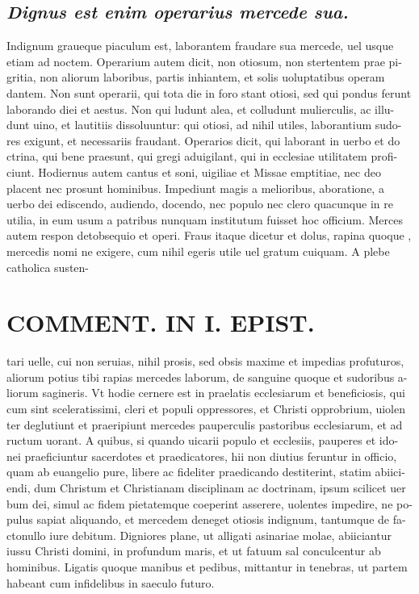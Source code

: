 \documentclass{article}
\begin{document}
\begin{pages}
\subsection*{\textit{Dignus est enim operarius mercede sua. }}\pstart Indignum graueque piaculum est, laborantem fraudare sua mercede, uel usque  etiam ad noctem. Operarium autem dicit, non otiosum, non stertentem prae pi- gritia, non aliorum laboribus, partis inhiantem, et solis uoluptatibus operam dantem. Non sunt operarii, qui tota die in foro stant otiosi, sed qui pondus ferunt laborando diei et aestus. Non qui ludunt alea, et colludunt mulierculis, ac illu- dunt uino, et lautitiis dissoluuntur: qui otiosi, ad nihil utiles, laborantium sudo- res exigunt, et necessariis fraudant. Operarios dicit, qui laborant in uerbo et do ctrina, qui bene praesunt, qui gregi aduigilant, qui in ecclesiae utilitatem profi- ciunt. Hodiernus autem cantus et soni, uigiliae et Missae emptitiae, nec deo placent nec prosunt hominibus. Impediunt magis a melioribus, aboratione, a uerbo dei ediscendo, audiendo, docendo, nec populo nec clero quacunque in re utilia, in eum usum a patribus nunquam institutum fuisset hoc officium. Merces autem respon detobsequio et operi. Fraus itaque dicetur et dolus, rapina quoque , mercedis nomi ne exigere, cum nihil egeris utile uel gratum cuiquam. A plebe catholica susten-  \pend
\section*{COMMENT. IN I. EPIST. }
\marginpar{[ p.524 ]}\pstart tari uelle, cui non seruias, nihil prosis, sed obsis maxime et impedias profuturos, aliorum potius tibi rapias mercedes laborum, de sanguine quoque et sudoribus a- liorum sagineris. Vt hodie cernere est in praelatis ecclesiarum et beneficiosis, qui cum sint sceleratissimi, cleri et populi oppressores, et Christi opprobrium, uiolen ter deglutiunt et praeripiunt mercedes pauperculis pastoribus ecclesiarum, et ad ructum uorant. A quibus, si quando uicarii populo et ecclesiis, pauperes et ido- nei praeficiuntur sacerdotes et praedicatores, hii non diutius feruntur in officio, quam ab euangelio pure, libere ac fideliter praedicando destiterint, statim abiici- endi, dum Christum et Christianam disciplinam ac doctrinam, ipsum scilicet uer bum dei, simul ac fidem pietatemque coeperint asserere, uolentes impedire, ne po- pulus sapiat aliquando, et mercedem deneget otiosis indignum, tantumque de fa- ctonullo iure debitum. Digniores plane, ut alligati asinariae molae, abiiciantur iussu Christi domini, in profundum maris, et ut fatuum sal conculcentur ab hominibus. Ligatis quoque manibus et pedibus, mittantur in tenebras, ut partem habeant cum infidelibus in saeculo futuro.  \pend
{}
{}

\end{pages}
\end{document}
